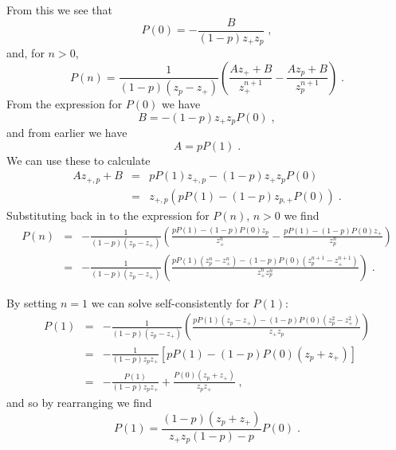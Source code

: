 \documentclass[a4paper,10pt]{article}
\begin{document}
From this we see that
\begin{equation}
 P(0) = - \frac{B}{(1-p)z_+z_p} \;,
\end{equation}
and, for $n>0$, 
\begin{equation}
 P(n) = \frac{ 1}{(1-p)(z_p-z_+)} \left( \frac{Az_++B}{z_+^{n+1}} - \frac{Az_p+B}{z_p^{n+1}} \right) \;. 
\end{equation}
From the expression for $P(0)$ we have
\begin{equation}\label{eq:B2_app}
  B = -(1-p)z_+z_pP(0) \;,
\end{equation}
and from earlier we have
\begin{equation}
  A = pP(1) \;.
\end{equation}
We can use these to calculate
\begin{eqnarray}
 Az_{+,p}+B &=& pP(1)z_{+,p} - (1-p)z_+z_pP(0) \nonumber \\
            &=& z_{+,p} (pP(1) - (1-p)z_{p,+}P(0) ) \;.
\end{eqnarray}
Substituting back in to the expression for $P(n)$, $n>0$ we find
\begin{eqnarray}
 P(n) &=& -\frac{1}{(1-p)(z_p-z_+)} \left( \frac{pP(1) - (1-p)P(0)z_p}{z_+^n} - \frac{pP(1) - (1-p)P(0)z_+}{z_p^n} \right) \nonumber \\
      &=& -\frac{1}{(1-p)(z_p-z_+)} \left( \frac{pP(1)(z_p^n-z_+^n) -(1-p)P(0)(z_p^{n+1} -z_+^{n+1})}{z_+^n z_p^n} \right) \;.
\end{eqnarray}

By setting $n=1$ we can solve self-consistently for $P(1)$:
\begin{eqnarray}
 P(1) &=& -\frac{1}{(1-p)(z_p-z_+)} \left( \frac{pP(1)(z_p-z_+) -(1-p)P(0)(z_p^{2} -z_+^{2})}{z_+ z_p} \right) \nonumber \\
      &=& -\frac{1}{(1-p)z_p z_+} \left[ pP(1) -(1-p)P(0)(z_p +z_+) \right] \nonumber \\
      &=& -\frac{P(1)}{(1-p)z_p z_+} + \frac{P(0)(z_p +z_+)}{z_pz_+} \;,
\end{eqnarray}
and so by rearranging we find
\begin{equation}
 P(1) = \frac{(1-p)(z_p + z_+)}{z_+ z_p (1-p) - p} P(0) \;.
\end{equation}
\end{document}
